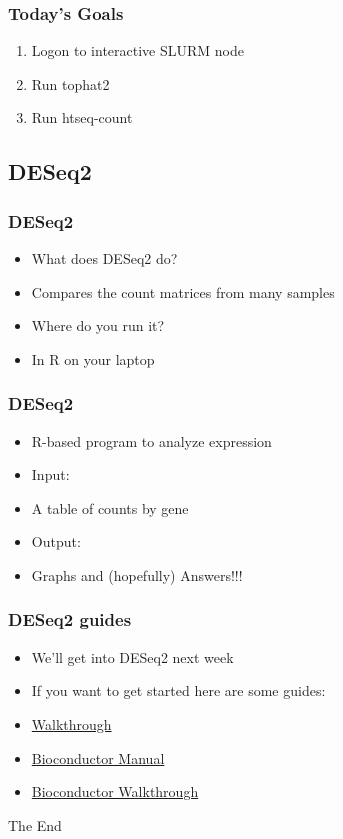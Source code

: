 \documentclass[14pt,handout]{beamer}
\begin{document}
\begin{frame}
\frametitle{Today's Goals}
\large
\begin{enumerate}
	\item<+-> Logon to interactive SLURM node
	\item<+-> Run tophat2
	\item<+-> Run htseq-count
\end{enumerate}
\end{frame}

\subsection{DESeq2}

\begin{frame}
\frametitle{DESeq2}
\begin{itemize}
	\item<+-> What does DESeq2 do?
	\item<+-> Compares the count matrices from many samples
	\item<+-> Where do you run it?
	\item<+-> In R on your laptop
\end{itemize}
\end{frame}

\begin{frame}
\frametitle{DESeq2}
\begin{itemize}
	\item<+-> R-based program to analyze expression
	\item<+-> Input: 
	\item<+-> A table of counts by gene
	\item<+-> Output: 
	\item<+-> Graphs and (hopefully) Answers!!!
\end{itemize}
\end{frame}


\begin{frame}
\frametitle{DESeq2 guides}
\begin{itemize}
	\item<+-> We'll get into DESeq2 next week
	\item<+-> If you want to get started here are some guides:
	\item<+-> \href{http://bioconductor.org/packages/devel/bioc/vignettes/DESeq2/inst/doc/DESeq2.html}{Walkthrough}
	\item<+-> \href{https://www.bioconductor.org/packages/release/bioc/html/DESeq2.html}{Bioconductor Manual} 
	\item<+-> \href{https://www.bioconductor.org/help/workflows/rnaseqGene/}{Bioconductor Walkthrough}
\end{itemize}
\end{frame}


\begin{frame}
\Huge{\centerline{The End}}
\end{frame}

\end{document}
